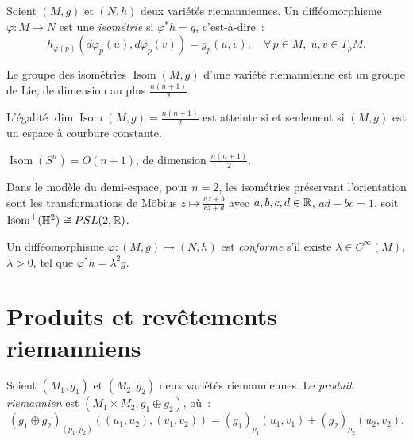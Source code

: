 \begin{definition}
Soient $(M, g)$ et $(N, h)$ deux vari\'et\'es riemanniennes. Un diff\'eomorphisme
$\varphi : M \to N$ est une \emph{isom\'etrie} si $\varphi^* h = g$, c'est-\`a-dire~:
\[
    h_{\varphi(p)}(d\varphi_p(u), d\varphi_p(v)) = g_p(u, v),
    \quad \forall\, p \in M,\; u, v \in T_pM.
\]
\end{definition}

\begin{theoreme}
Le groupe des isom\'etries $\operatorname{Isom}(M, g)$ d'une vari\'et\'e riemannienne
est un groupe de Lie, de dimension au plus $\frac{n(n+1)}{2}$.
\end{theoreme}

\begin{remarque}
L'\'egalit\'e $\dim \operatorname{Isom}(M,g) = \frac{n(n+1)}{2}$ est atteinte si et
seulement si $(M, g)$ est un espace \`a courbure constante.
\end{remarque}

\begin{exemple}
$\operatorname{Isom}(S^n) = O(n+1)$, de dimension $\frac{n(n+1)}{2}$.
\end{exemple}

\begin{exemple}
Dans le mod\`ele du demi-espace, pour $n=2$, les isom\'etries pr\'eservant l'orientation
sont les transformations de M\"obius $z \mapsto \frac{az+b}{cz+d}$ avec
$a, b, c, d \in \mathbb{R}$, $ad - bc = 1$, soit $\operatorname{Isom}^+(\mathbb{H}^2)
\cong PSL(2, \mathbb{R})$.
\end{exemple}

\begin{definition}
Un diff\'eomorphisme $\varphi : (M,g) \to (N,h)$ est \emph{conforme} s'il existe
$\lambda \in C^\infty(M)$, $\lambda > 0$, tel que $\varphi^* h = \lambda^2 g$.
\end{definition}

\section{Produits et rev\^etements riemanniens}

\begin{definition}
Soient $(M_1, g_1)$ et $(M_2, g_2)$ deux vari\'et\'es riemanniennes. Le
\emph{produit riemannien} est $(M_1 \times M_2, g_1 \oplus g_2)$, o\`u~:
\[
    (g_1 \oplus g_2)_{(p_1, p_2)}((u_1, u_2), (v_1, v_2))
    = (g_1)_{p_1}(u_1, v_1) + (g_2)_{p_2}(u_2, v_2).
\]
\end{definition}


